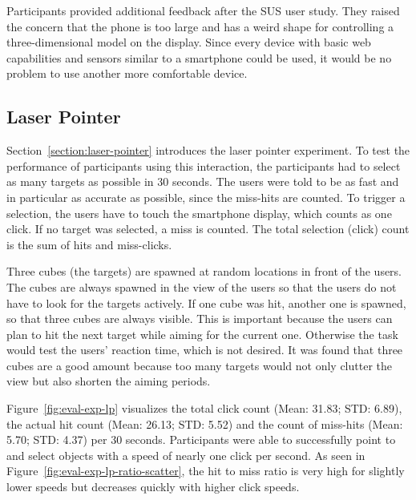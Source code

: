 Participants provided additional feedback after the \gls{SUS} user study. They raised the concern that the phone is too large and has a weird shape for controlling a three-dimensional model on the display. Since every device with basic web capabilities and sensors similar to a smartphone could be used, it would be no problem to use another more comfortable device. 


\subsection{Laser Pointer}\label{section:eval-res-lp}

Section~\ref{section:laser-pointer} introduces the laser pointer experiment. To test the performance of participants using this interaction, the participants had to select as many targets as possible in 30 seconds. The users were told to be as fast and in particular as accurate as possible, since the miss-hits are counted. To trigger a selection, the users have to touch the smartphone display, which counts as one click. If no target was selected, a miss is counted. The total selection (click) count is the sum of hits and miss-clicks.

Three cubes (the targets) are spawned at random locations in front of the users. The cubes are always spawned in the view of the users so that the users do not have to look for the targets actively. 
If one cube was hit, another one is spawned, so that three cubes are always visible. This is important because the users can plan to hit the next target while aiming for the current one. Otherwise the task would test the users' reaction time, which is not desired. It was found that three cubes are a good amount because too many targets would not only clutter the view but also shorten the aiming periods.

Figure~\ref{fig:eval-exp-lp} visualizes the total click count (Mean: 31.83; \gls{STD}: 6.89), the actual hit count (Mean: 26.13; \gls{STD}: 5.52) and the count of miss-hits (Mean: 5.70; \gls{STD}: 4.37) per 30 seconds. Participants were able to successfully point to and select objects with a speed of nearly one click per second. As seen in Figure~\ref{fig:eval-exp-lp-ratio-scatter}, the hit to miss ratio is very high for slightly lower speeds but decreases quickly with higher click speeds.

